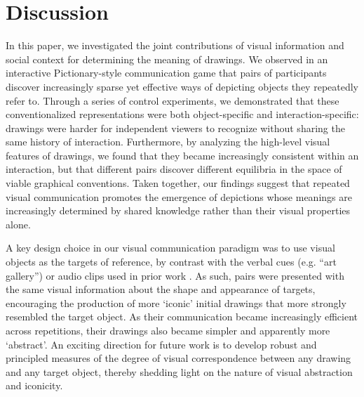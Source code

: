 \documentclass[10pt,letterpaper]{article}
\begin{document}
\section{Discussion}

In this paper, we investigated the joint contributions of visual information and social context for determining the meaning of drawings.
We observed in an interactive Pictionary-style communication game that pairs of participants discover increasingly sparse yet effective ways of depicting objects they repeatedly refer to.
Through a series of control experiments, we demonstrated that these conventionalized representations were both object-specific and interaction-specific: drawings were harder for independent viewers to recognize without sharing the same history of interaction.
Furthermore, by analyzing the high-level visual features of drawings, we found that they became increasingly consistent within an interaction, but that different pairs discover different equilibria in the space of viable graphical conventions.
Taken together, our findings suggest that repeated visual communication promotes the emergence of depictions whose meanings are increasingly determined by shared knowledge rather than their visual properties alone.

A key design choice in our visual communication paradigm was to use visual objects as the targets of reference, by contrast with the verbal cues (e.g. ``art gallery'') or audio clips used in prior work \cite{GalantucciGarrod11_ExperimentalSemiotics}. %
As such, pairs were presented with the same visual information about the shape and appearance of targets, encouraging the production of more `iconic' initial drawings that more strongly resembled the target object.
As their communication became increasingly efficient across repetitions, their drawings also became simpler and apparently more `abstract'.
An exciting direction for future work is to develop robust and principled measures of the degree of visual correspondence between any drawing and any target object, thereby shedding light on the nature of visual abstraction and iconicity.
\end{document}

